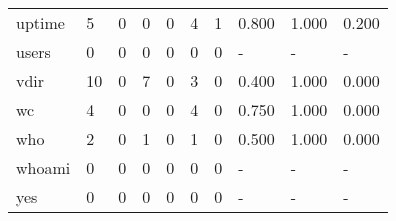 \begin{longtable}{lp{1.3cm}p{1.3cm}p{1.3cm}p{1.3cm}p{1.3cm}p{1.3cm}p{1.3cm}p{1.3cm}p{1.3cm}}
uptime    &                      5 &                                  0 &                                 0 &                                0 &                                 4 &                               1 &                                0.800 &                                  1.000 &                                0.200 \\
users     &                      0 &                                  0 &                                 0 &                                0 &                                 0 &                               0 &                                    - &                                      - &                                    - \\
vdir      &                     10 &                                  0 &                                 7 &                                0 &                                 3 &                               0 &                                0.400 &                                  1.000 &                                0.000 \\
wc        &                      4 &                                  0 &                                 0 &                                0 &                                 4 &                               0 &                                0.750 &                                  1.000 &                                0.000 \\
who       &                      2 &                                  0 &                                 1 &                                0 &                                 1 &                               0 &                                0.500 &                                  1.000 &                                0.000 \\
whoami    &                      0 &                                  0 &                                 0 &                                0 &                                 0 &                               0 &                                    - &                                      - &                                    - \\
yes       &                      0 &                                  0 &                                 0 &                                0 &                                 0 &                               0 &                                    - &                                      - &                                    - \\
\end{longtable}
